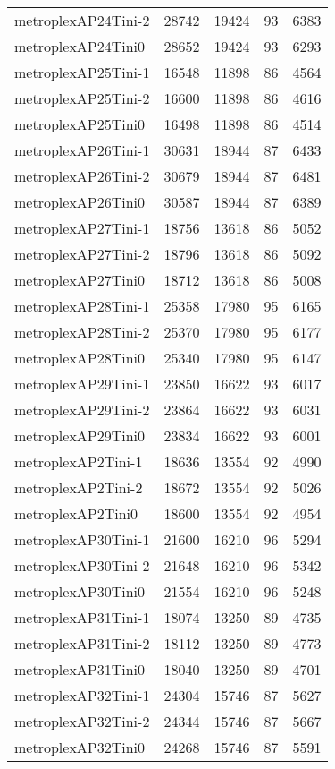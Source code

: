 \begin{longtable}{lrrrr}
metroplexAP24Tini-2 & 28742 & 19424 & 93 & 6383 \\
metroplexAP24Tini0 & 28652 & 19424 & 93 & 6293 \\
metroplexAP25Tini-1 & 16548 & 11898 & 86 & 4564 \\
metroplexAP25Tini-2 & 16600 & 11898 & 86 & 4616 \\
metroplexAP25Tini0 & 16498 & 11898 & 86 & 4514 \\
metroplexAP26Tini-1 & 30631 & 18944 & 87 & 6433 \\
metroplexAP26Tini-2 & 30679 & 18944 & 87 & 6481 \\
metroplexAP26Tini0 & 30587 & 18944 & 87 & 6389 \\
metroplexAP27Tini-1 & 18756 & 13618 & 86 & 5052 \\
metroplexAP27Tini-2 & 18796 & 13618 & 86 & 5092 \\
metroplexAP27Tini0 & 18712 & 13618 & 86 & 5008 \\
metroplexAP28Tini-1 & 25358 & 17980 & 95 & 6165 \\
metroplexAP28Tini-2 & 25370 & 17980 & 95 & 6177 \\
metroplexAP28Tini0 & 25340 & 17980 & 95 & 6147 \\
metroplexAP29Tini-1 & 23850 & 16622 & 93 & 6017 \\
metroplexAP29Tini-2 & 23864 & 16622 & 93 & 6031 \\
metroplexAP29Tini0 & 23834 & 16622 & 93 & 6001 \\
metroplexAP2Tini-1 & 18636 & 13554 & 92 & 4990 \\
metroplexAP2Tini-2 & 18672 & 13554 & 92 & 5026 \\
metroplexAP2Tini0 & 18600 & 13554 & 92 & 4954 \\
metroplexAP30Tini-1 & 21600 & 16210 & 96 & 5294 \\
metroplexAP30Tini-2 & 21648 & 16210 & 96 & 5342 \\
metroplexAP30Tini0 & 21554 & 16210 & 96 & 5248 \\
metroplexAP31Tini-1 & 18074 & 13250 & 89 & 4735 \\
metroplexAP31Tini-2 & 18112 & 13250 & 89 & 4773 \\
metroplexAP31Tini0 & 18040 & 13250 & 89 & 4701 \\
metroplexAP32Tini-1 & 24304 & 15746 & 87 & 5627 \\
metroplexAP32Tini-2 & 24344 & 15746 & 87 & 5667 \\
metroplexAP32Tini0 & 24268 & 15746 & 87 & 5591 \\

\end{longtable}

